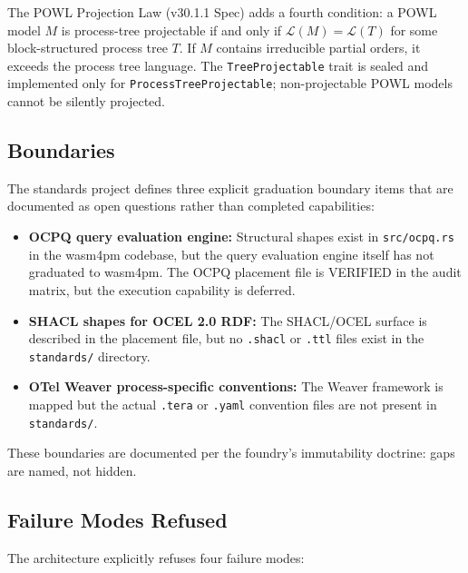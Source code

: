 The POWL Projection Law (v30.1.1 Spec) adds a fourth condition: a POWL model $M$ is
process-tree projectable if and only if $\mathcal{L}(M) = \mathcal{L}(T)$ for some
block-structured process tree $T$. If $M$ contains irreducible partial orders, it exceeds
the process tree language. The \texttt{TreeProjectable} trait is sealed and implemented
only for \texttt{ProcessTreeProjectable}; non-projectable POWL models cannot be silently
projected.

\subsection{Boundaries}
\label{sec:standards-arch-boundaries}

The standards project defines three explicit graduation boundary items that are
documented as open questions rather than completed capabilities:

\begin{itemize}
  \item \textbf{OCPQ query evaluation engine:} Structural shapes exist in
        \texttt{src/ocpq.rs} in the wasm4pm codebase, but the query evaluation engine
        itself has not graduated to wasm4pm. The OCPQ placement file is VERIFIED in the
        audit matrix, but the execution capability is deferred.
  \item \textbf{SHACL shapes for OCEL 2.0 RDF:} The SHACL/OCEL surface is described in
        the placement file, but no \texttt{.shacl} or \texttt{.ttl} files exist in the
        \texttt{standards/} directory.
  \item \textbf{OTel Weaver process-specific conventions:} The Weaver framework is mapped
        but the actual \texttt{.tera} or \texttt{.yaml} convention files are not present
        in \texttt{standards/}.
\end{itemize}

These boundaries are documented per the foundry's immutability doctrine: gaps are named,
not hidden.

\subsection{Failure Modes Refused}
\label{sec:standards-arch-failures}

The architecture explicitly refuses four failure modes:

